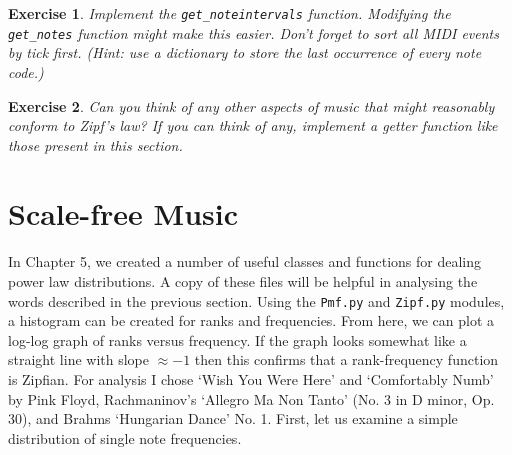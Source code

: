 \documentclass[10pt]{book}
\newtheorem{exercise}{Exercise}[chapter]
\begin{document}
\begin{exercise}
Implement the \texttt{get\_noteintervals} function. Modifying the \texttt{get\_notes} function might make this easier. Don't forget to sort all MIDI events by tick first. (Hint: use a dictionary to store the last occurrence of every note code.)
\end{exercise}

\begin{exercise}
Can you think of any other aspects of music that might reasonably conform to Zipf's law? If you can think of any, implement a getter function like those present in this section.
\end{exercise}




\section{Scale-free Music}
In Chapter 5, we created a number of useful classes and functions for dealing  power law distributions. A copy of these files will be helpful in analysing the words described in the previous section. Using the \texttt{Pmf.py} and \texttt{Zipf.py} modules, a histogram can be created for ranks and frequencies. From here, we can plot a log-log graph of ranks versus frequency. If the graph looks somewhat like a straight line with slope $\approx -1$ then this confirms that a rank-frequency function is Zipfian. For analysis I chose `Wish You Were Here' and `Comfortably Numb' by Pink Floyd, Rachmaninov's `Allegro Ma Non Tanto' (No. 3 in D minor, Op. 30), and Brahms `Hungarian Dance' No. 1. First, let us examine a simple distribution of single note frequencies.
\end{document}
